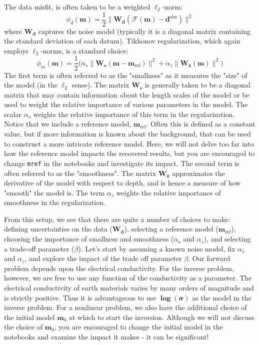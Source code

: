 \documentclass[11pt,oneside]{article}
\begin{document}
The data misfit, is often taken to be a weighted $\ell_2$-norm:
\begin{equation}
\phi_d(\mathbf{m}) = \frac{1}{2}\|\mathbf{W_d} (\mathcal{F}(\mathbf{m}) - \mathbf{d}^{\text{obs}})\|^2
\end{equation}
where $\mathbf{W_d}$ captures the noise model (typically it is a diagonal matrix containing the standard deviation of each datum). Tikhonov regularization, which again employs $\ell_2$-norms, is a standard choice:
\begin{equation}
\phi_m(\mathbf{m}) = \frac{1}{2}\big(\alpha_s\|\mathbf{W_s} (\mathbf{m} - \mathbf{m}_{\text{ref}})\|^2 + \alpha_z\|\mathbf{W_z} (\mathbf{m})\|^2 \big)
\end{equation}
The first term is often referred to as the "smallness" as it measures the "size" of the model (in the $\ell_2$ sense). The matrix $\mathbf{W_s}$ is generally taken to be a diagonal matrix that may contain information about the length scales of the model or be used to weight the relative importance of various parameters in the model. The scalar $\alpha_s$ weights the relative importance of this term in the regularization. Notice that we include a reference model, $\mathbf{m}_{\text{ref}}$. Often this is defined as a constant value, but if more information is known about the background, that can be used to construct a more intricate reference model. Here, we will not delve too far into how the reference model impacts the recovered results, but you are encouraged to change \texttt{mref} in the notebooks and investigate its impact. The second term is often referred to as the "smoothness". The matrix $\mathbf{W_z}$ approximates the derivative of the model with respect to depth, and is hence a measure of how "smooth" the model is. The term $\alpha_z$ weights the relative importance of smoothness in the regularization.

From this setup, we see that there are quite a number of choices to make: defining uncertainties on the data ($\mathbf{W_d}$), selecting a reference model ($\mathbf{m}_{\text{ref}}$), choosing the importance of smallness and smoothness ($\alpha_s$ and $\alpha_z$), and selecting a trade-off parameter ($\beta$). Let’s start by assuming a known noise model, fix $\alpha_s$ and $\alpha_z$, and explore the impact of the trade off parameter $\beta$. Our forward problem depends upon the electrical conductivity. For the inverse problem, however, we are free to use any function of the conductivity as a parameter. The electrical conductivity of earth materials varies by many orders of magnitude and is strictly positive. Thus it is advantageous to use $\mathbf{\log(\sigma)}$ as the model in the inverse problem. For a nonlinear problem, we also have the additional choice of the initial model $\mathbf{m}_0$ at which to start the inversion. Although we will not discuss the choice of $\mathbf{m}_0$, you are encouraged to change the initial model in the notebooks and examine the impact it makes - it can be significant!
\end{document}
